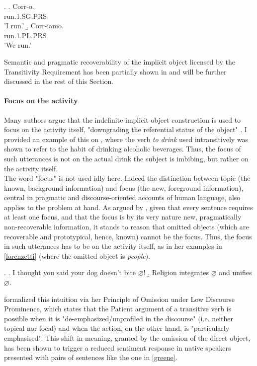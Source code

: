 \ex. \label{epp_intro} \a. \label{epp_intro1} Corr-o. \\ run.1.SG.PRS \\ 'I run.'
\b. \label{epp_intro2} Corr-iamo. \\ run.1.PL.PRS \\ 'We run.'

Semantic and pragmatic recoverability of the implicit object licensed by the Transitivity Requirement has been partially shown in  and will be further discussed in the rest of this Section.


\paragraph{Focus on the activity} 

Many authors \parencite{Liu2008, Garcia-VelascoMunoz2002, Fillmore1986, Ahringberg2015, Levin1993, Yasutake1987, Goldberg2005} argue that the indefinite implicit object construction is used to focus on the activity itself, "downgrading the referential status of the object" \parencite[7-8]{Garcia-VelascoMunoz2002}. I provided an example of this on , where the verb \textit{to drink} used intransitively was shown to refer to the habit of drinking alcoholic beverages. Thus, the focus of such utterances is not on the actual drink the subject is imbibing, but rather on the activity itself.\\
The word "focus" is not used idly here. Indeed the distinction between topic (the known, background information) and focus (the new, foreground information), central in pragmatic and discourse-oriented accounts of human language, also applies to the problem at hand. As argued by \textcite[66]{Lorenzetti2008}, given that every sentence requires at least one focus, and that the focus is by its very nature new, pragmatically non-recoverable information, it stands to reason that omitted objects (which are recoverable and prototypical, hence, known) cannot be the focus. Thus, the focus in such utterances has to be on the activity itself, as in her examples in \ref{lorenzetti} (where the omitted object is \textit{people}).

\ex. \label{lorenzetti} \a. \label{lorenzetti1} I thought you said your dog doesn’t bite $\varnothing$!
\b. \label{lorenzetti2} Religion integrates $\varnothing$ and unifies $\varnothing$.

\textcite{Goldberg2005} formalized this intuition via her Principle of Omission under Low Discourse Prominence, which states that the Patient argument of a transitive verb is possible when it is "de-emphasized/unprofiled in the discourse" (i.e. neither topical nor focal) and when the action, on the other hand, is "particularly emphasised". This shift in meaning, granted by the omission of the direct object, has been shown \parencite[507]{GreeneResnik2009more} to trigger a reduced sentiment response in native speakers presented with pairs of sentences like the one in \ref{greene}.

